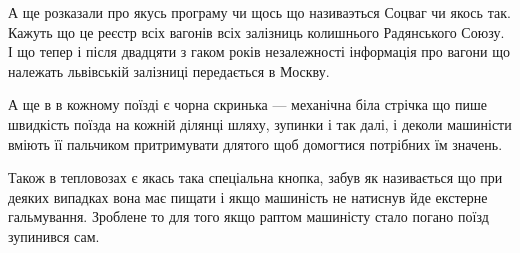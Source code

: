 А ще розказали про якусь програму чи щось що називаэться Соцваг чи якось так. Кажуть що це реєстр всіх вагонів всіх залізниць колишнього Радянського Союзу. І що тепер і після двадцяти з гаком  років незалежності інформація про вагони що належать львівській залізниці передається в Москву.

А ще в в кожному поїзді є чорна скринька — механічна біла стрічка що пише швидкість поїзда на кожній ділянці шляху, зупинки і так далі, і деколи машиністи вміють її пальчиком притримувати длятого щоб домогтися потрібних їм значень.

Також в тепловозах є якась така спеціальна кнопка, забув як називається що при деяких випадках вона має пищати і якщо машиність не натиснув йде екстерне гальмування. Зроблене то для того якщо раптом машиністу стало погано поїзд зупинився сам.




